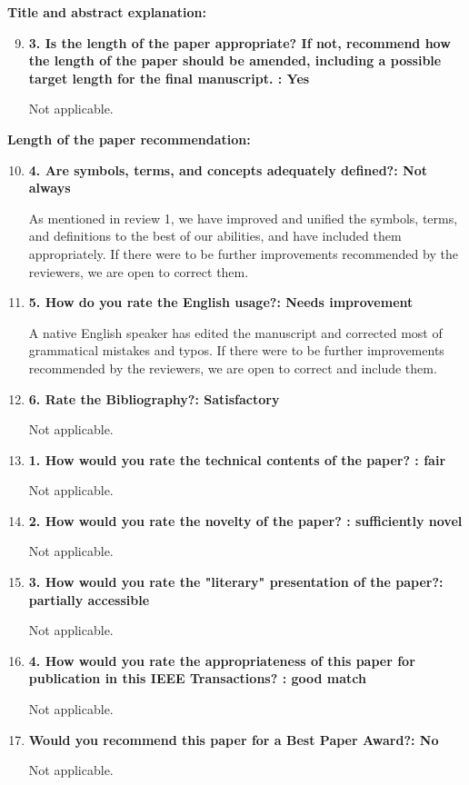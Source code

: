 \documentclass[12pt]{article}
\begin{document}
\textbf{Title and abstract explanation:}


\begin{enumerate}
\setcounter{enumi}{8}
\item \textbf{3. Is the length of the paper appropriate? If not, recommend how the length 
of the paper should be amended, including a possible target length for the final 
manuscript. : Yes}

Not applicable.

\end{enumerate}


\textbf{Length of the paper recommendation:}

\begin{enumerate}
\setcounter{enumi}{9}

\item  \textbf{4. Are symbols, terms, and concepts adequately defined?: Not always}

As mentioned in review 1, we have improved and unified the symbols, terms, and 
definitions to the best of our 
abilities, and have 
included 
them appropriately.  If there 
were to be further improvements recommended by the reviewers, we are open to correct 
them. 

\item \textbf{5. How do you rate the English usage?: Needs improvement}

A native 
English 
speaker has edited the manuscript and corrected most of grammatical mistakes and typos.  
If there 
were to be further improvements recommended by the reviewers, we are open to correct and 
include  
them. 

\item \textbf{6. Rate the Bibliography?: Satisfactory}

Not applicable.

\item \textbf{1. How would you rate the technical contents of the paper? : fair}

Not applicable.

\item \textbf{2. How would you rate the novelty of the paper? : sufficiently novel}

Not applicable.

\item \textbf{3. How would you rate the "literary" presentation of the paper?: partially 
accessible}

Not applicable.

\item  \textbf{4. How would you rate the appropriateness of this paper for publication in 
this IEEE Transactions? : good match}

Not applicable.

\item \textbf{Would you recommend this paper for a Best Paper Award?: No}

Not applicable.

\end{enumerate}
\end{document}
